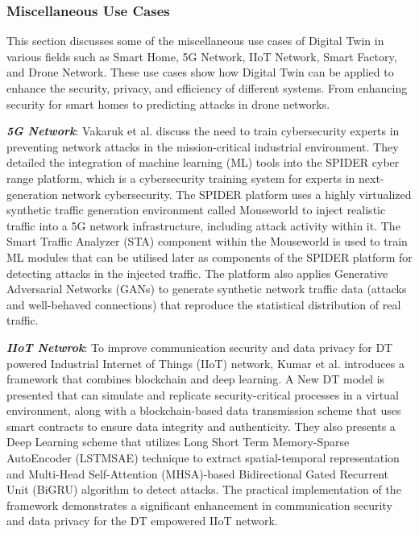 \subsubsection{Miscellaneous Use Cases } 
This section discusses some of the miscellaneous use cases of Digital Twin in various fields such as Smart Home, 5G Network, IIoT Network, Smart Factory, and Drone Network. These use cases show how Digital Twin can be applied to enhance the security, privacy, and efficiency of different systems. From enhancing security for smart homes to predicting attacks in drone networks.
  

\textbf{\textit{5G Network}}: Vakaruk et al.\cite{vakarukDigitalTwinNetwork2021} discuss the need to train cybersecurity experts in preventing network attacks in the mission-critical industrial environment. They detailed the integration of machine learning (ML) tools into the SPIDER cyber range platform, which is a cybersecurity training system for experts in next-generation network cybersecurity. The SPIDER platform uses a highly virtualized synthetic traffic generation environment called Mouseworld to inject realistic traffic into a 5G network infrastructure, including attack activity within it. The Smart Traffic Analyzer (STA) component within the Mouseworld is used to train ML modules that can be utilised later as components of the SPIDER platform for detecting attacks in the injected traffic. The platform also applies Generative Adversarial Networks (GANs) to generate synthetic network traffic data (attacks and well-behaved connections) that reproduce the statistical distribution of real traffic. 

\textbf{\textit{IIoT Netwrok}}: To improve communication security and data privacy for DT powered Industrial Internet of Things (IIoT) network, Kumar et al.\cite{kumarBlockchainDeepLearning2022} introduces a framework that combines blockchain and deep learning. A New DT model is presented that  can simulate and replicate security-critical processes in a virtual environment, along with a blockchain-based data transmission scheme that uses smart contracts to ensure data integrity and authenticity. They also presents a Deep Learning scheme that utilizes Long Short Term Memory-Sparse AutoEncoder (LSTMSAE) technique to extract spatial-temporal representation and Multi-Head Self-Attention (MHSA)-based Bidirectional Gated Recurrent Unit (BiGRU) algorithm to detect attacks. The practical implementation of the framework demonstrates a significant enhancement in communication security and data privacy for the DT empowered IIoT network.

